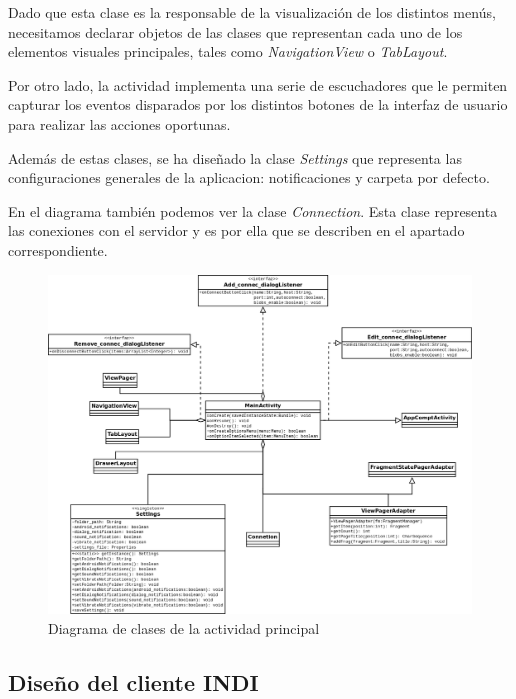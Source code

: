\bigskip
Dado que esta clase es la responsable de la visualización de los distintos menús, necesitamos declarar objetos de las clases que representan cada uno de los elementos visuales principales, tales como \textit{NavigationView} o \textit{TabLayout}.

\bigskip
Por otro lado, la actividad implementa una serie de escuchadores que le permiten capturar los eventos disparados por los distintos botones de la interfaz de usuario para realizar las acciones oportunas.

\bigskip
Además de estas clases, se ha diseñado la clase \textit{Settings} que representa las configuraciones generales de la aplicacion: notificaciones y carpeta por defecto.

\bigskip
En el diagrama también podemos ver la clase \textit{Connection}. Esta clase representa las conexiones con el servidor y es por ella que se describen en el apartado correspondiente.


\bigskip
\begin{figure}[!ht]
  \begin{center}
  \includegraphics[width=1\textwidth]{../images/main_activity.png}
  \caption{Diagrama de clases de la actividad principal}
  \label{fig:diag_main_activity}
  \end{center}
\end{figure}


\newpage
\subsection{Diseño del cliente INDI}

